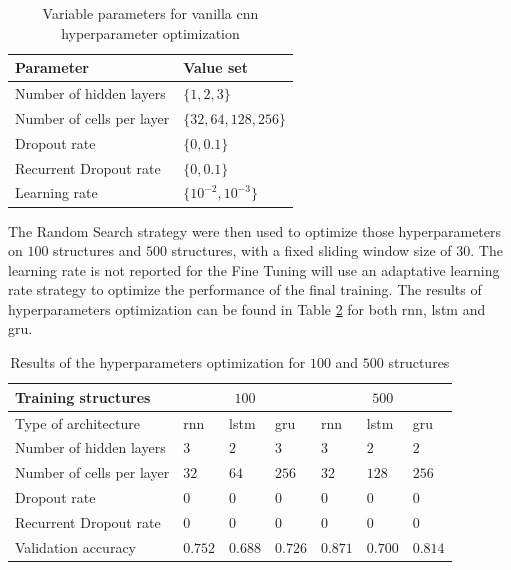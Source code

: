 \documentclass[conference]{IEEEtran}
\begin{document}
\begin{table}[htp]
	\centering
	\caption{Variable parameters for vanilla \gls{cnn} hyperparameter optimization}
	\label{tab:variable_parameters_rnn_optimization}
	\begin{tabular}{ll}
		\textbf{Parameter} & \textbf{Value set} \\
		\hline
		Number of hidden layers & $ \{1, 2, 3\} $ \\
		Number of cells per layer & $ \{32, 64, 128, 256\} $ \\
		Dropout rate & $ \{0, 0.1\} $ \\
		Recurrent Dropout rate & $ \{0, 0.1\} $ \\
		Learning rate & $ \{10^{-2}, 10^{-3}\} $
	\end{tabular}
\end{table}

The Random Search strategy were then used to optimize those hyperparameters on $ 100 $ structures and $ 500 $ structures, with a fixed sliding window size of $30$. The learning rate is not reported for the Fine Tuning will use an adaptative learning rate strategy to optimize the performance of the final training. The results of hyperparameters optimization can be found in Table \ref{tab:results_parameters_rnn_optimization} for both \gls{rnn}, \gls{lstm} and \gls{gru}.



\begin{table}[htp]
	\centering
	\caption{Results of the hyperparameters optimization for $ 100 $ and $ 500 $ structures}
	\label{tab:results_parameters_rnn_optimization}
	\begin{tabular}{p{2.5cm}|lll|lll}
		Training structures & \multicolumn{3}{c}{$ 100 $} & \multicolumn{3}{c}{$ 500 $} \\
		\hline
		Type of architecture & \gls{rnn} & \gls{lstm} & \gls{gru} & \gls{rnn} & \gls{lstm} & \gls{gru}\\
		\hline
		Number of hidden layers & $3$ & $2$ & $3$ & $3$ & $2$ & $2$ \\
		Number of cells per layer & $32$ & $64$ & $256$ & $32$ & $128$ & $256$ \\
		Dropout rate & $0$ & $0$ & $0$ & $0$ & $0$ & $0$ \\
		Recurrent Dropout rate & $0$ & $0$ & $0$& $0$ & $0$ & $0$ \\
		\hline
		Validation accuracy & $0.752$ & $0.688$ & $0.726$ & $0.871$ & $0.700$ & $0.814$
	\end{tabular}
\end{table}
\end{document}
